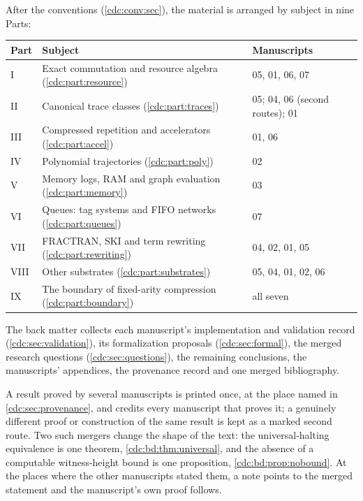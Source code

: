 \documentclass[11pt,a4paper]{article}
\theoremstyle{definition}
\theoremstyle{remark}
\begin{document}
After the conventions (\cref{cdc:conv:sec}), the material is arranged by subject in nine Parts:
\begin{center}
\small
\begin{tabularx}{\textwidth}{@{}lXl@{}}
\toprule
Part & Subject & Manuscripts\\
\midrule
I & Exact commutation and resource algebra (\cref{cdc:part:resource}) & 05, 01, 06, 07\\
II & Canonical trace classes (\cref{cdc:part:traces}) & 05; 04, 06 (second routes); 01\\
III & Compressed repetition and accelerators (\cref{cdc:part:accel}) & 01, 06\\
IV & Polynomial trajectories (\cref{cdc:part:poly}) & 02\\
V & Memory logs, RAM and graph evaluation (\cref{cdc:part:memory}) & 03\\
VI & Queues: tag systems and FIFO networks (\cref{cdc:part:queues}) & 07\\
VII & FRACTRAN, SKI and term rewriting (\cref{cdc:part:rewriting}) & 04, 02, 01, 05\\
VIII & Other substrates (\cref{cdc:part:substrates}) & 05, 04, 01, 02, 06\\
IX & The boundary of fixed-arity compression (\cref{cdc:part:boundary}) & all seven\\
\bottomrule
\end{tabularx}
\end{center}
The back matter collects each manuscript's implementation and validation record (\cref{cdc:sec:validation}), its formalization proposals (\cref{cdc:sec:formal}), the merged research questions (\cref{cdc:sec:questions}), the remaining conclusions, the manuscripts' appendices, the provenance record and one merged bibliography.

A result proved by several manuscripts is printed once, at the place named in \cref{cdc:sec:provenance}, and credits every manuscript that proves it; a genuinely different proof or construction of the same result is kept as a marked second route. Two such mergers change the shape of the text: the universal-halting equivalence is one theorem, \cref{cdc:bd:thm:universal}, and the absence of a computable witness-height bound is one proposition, \cref{cdc:bd:prop:nobound}. At the places where the other manuscripts stated them, a note points to the merged statement and the manuscript's own proof follows.
\end{document}
